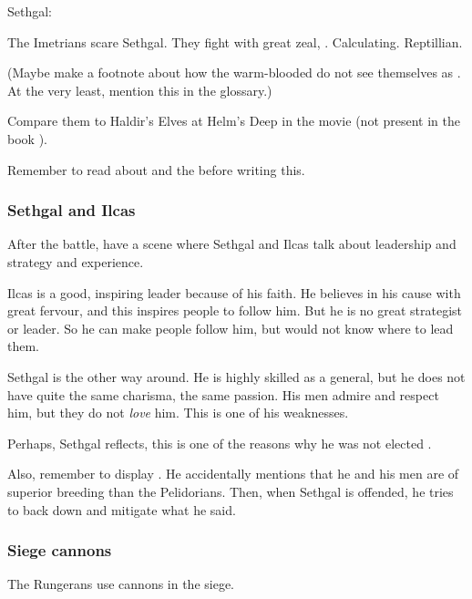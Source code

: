 \begin{garbage}
\begin{prose}
  Sethgal: 
\end{prose}

The Imetrians scare Sethgal. 
They fight with great zeal, . 
Calculating. 
Reptillian. 

(Maybe make a footnote about how the warm-blooded \scathae{} do not see themselves as . At the very least, mention this in the glossary.)

Compare them to Haldir's Elves at Helm's Deep in the movie \cite{Movie:LordoftheRings:II} (not present in the book \cite{JRRTolkien:LordoftheRings:II}). 

Remember to read about  and the \nycans{} before writing this. 





\subsubsection{Sethgal and Ilcas}
After the battle, have a scene where Sethgal and Ilcas talk about leadership and strategy and experience. 

Ilcas is a good, inspiring leader because of his faith. 
He believes in his cause with great fervour, and this inspires people to follow him.
But he is no great strategist or leader. 
So he can make people follow him, but would not know where to lead them. 

Sethgal is the other way around. 
He is highly skilled as a general, but he does not have quite the same charisma, the same passion. 
His men admire and respect him, but they do not \emph{love} him. 
This is one of his weaknesses. 

Perhaps, Sethgal reflects, this is one of the reasons why he was not elected \rayuth{}. 

Also, remember to display . 
He accidentally mentions that he and his men are of superior breeding than the Pelidorians. 
Then, when Sethgal is offended, he tries to back down and mitigate what he said. 





\subsubsection{Siege cannons}
The Rungerans use cannons in the siege. 






\end{garbage}
